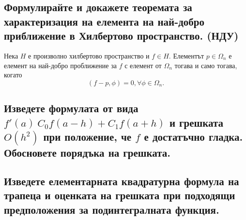 \documentclass[12pt]{article}
\numberwithin{equation}{subsection}
\numberwithin{theorem}{subsection}
\numberwithin{definition}{subsection}
\numberwithin{corollary}{subsection}
\begin{document}
\subsection{Формулирайте и докажете теоремата за характеризация на елемента на най-добро приближение в Хилбертово пространство. (НДУ)}
  \theorem
  Нека $H$ е произволно хилбертово пространство и $f\in H$. Елементът $p\in\Omega_n$ е елемент на най-добро проближение за $f$ с елемент от $\Omega_n$ тогава и само тогава, когато
  \begin{equation}\label{ndp}
    (f-p,\phi)=0, \forall\phi\in\Omega_n.
  \end{equation}
  \proof
\subsection{Изведете формулата от вида $f'(a) ~ C_0 f(a - h) + C_1 f(a + h)$ и грешката $O(h^2)$ при положение, че $f$ е достатъчно гладка.
        Обосновете порядъка на грешката.}

\subsection{Изведете елементарната квадратурна формула на трапеца и оценката на грешката при подходящи предположения за подинтегралната функция.}
\end{document}
